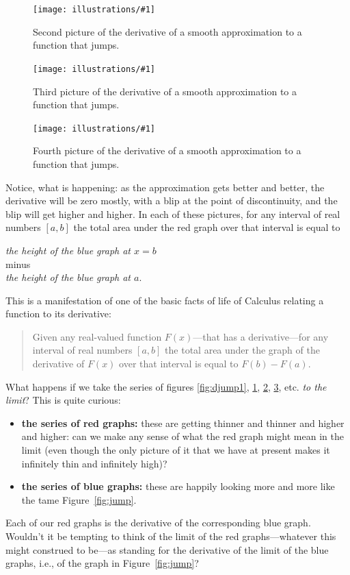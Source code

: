 \documentclass[11pt]{article}
\newcommand{\ill}[3]{ 
   \begin{figure}[H]
   \begin{center}
   \texttt{[image: illustrations/\#1]}
   \caption{#3}
   \end{center}
    \end{figure}
}
\theoremstyle{plain}
\theoremstyle{definition}
\numberwithin{equation}{section}
\numberwithin{figure}{section}
\numberwithin{table}{section}
\begin{document}
\ill{jump-smooth-deriv-2}{0.5}{Second picture of the derivative of
a smooth approximation to a function that jumps.\label{fig:djump2}}
\ill{jump-smooth-deriv-05}{0.5}{Third picture of the derivative of
a smooth approximation to a function that jumps.\label{fig:djump3}}
\ill{jump-smooth-deriv-01}{0.5}{Fourth picture of the derivative of
a smooth approximation to a function that jumps.\label{fig:djump4}}


Notice, what is happening: as the approximation gets better and
better, the derivative will be zero mostly, with a blip at the point
of discontinuity, and the blip will get higher and higher. 
In each of these pictures,  for any interval of real numbers $[a,b]$ the total area under the red graph over that interval is equal to
\begin{center}
{\it the height of the blue graph at $x=b$}\\
minus\\
{\it  the height of the blue graph  at $a$}. 
\end{center}
This is a manifestation of one of the basic facts of life of Calculus relating a function to its derivative:
  \vskip10pt
  \begin{quote} Given any real-valued  function $F(x)$---that has a derivative---for any interval of real numbers $[a,b]$ the total area under the graph of the derivative of $F(x)$ over that interval is equal to $F(b)-F(a)$. 
  \end{quote}  \vskip10pt
    What happens if we take the series of figures \ref{fig:djump1}, \ref{fig:djump2}, \ref{fig:djump3}, \ref{fig:djump4}, etc. {\it to the limit}?  This is quite curious: 
  
  \begin{itemize}
  \item {\bf the series of red graphs:} these are getting thinner and thinner and higher and higher: can we make any sense of what the red graph might mean in the limit (even though the only picture of it that we have at present makes it infinitely thin and infinitely high)?
  
   \item {\bf the series of blue graphs:} these are happily looking more and more like the tame Figure~\ref{fig:jump}. 
   \end{itemize} 
  
  Each of our red graphs is the derivative of the corresponding blue graph. Wouldn't it be tempting to think of the limit of the red graphs---whatever this might construed to be---as standing for the derivative of the limit of the blue graphs, i.e., of the graph in Figure~\ref{fig:jump}?
  
\end{document}
